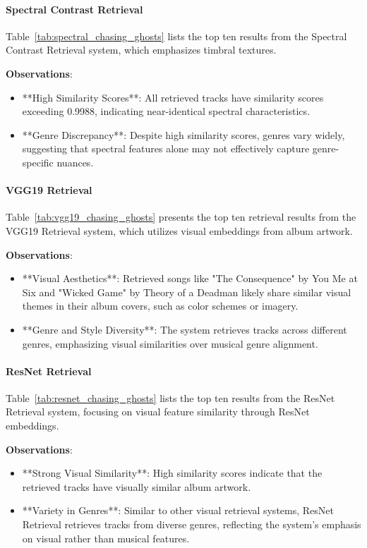 \documentclass[sigconf]{acmart}
\begin{document}
\paragraph{Spectral Contrast Retrieval}

Table~\ref{tab:spectral_chasing_ghosts} lists the top ten results from the Spectral Contrast Retrieval system, which emphasizes timbral textures.

\textbf{Observations}:
\begin{itemize}
    \item **High Similarity Scores**: All retrieved tracks have similarity scores exceeding 0.9988, indicating near-identical spectral characteristics.
    \item **Genre Discrepancy**: Despite high similarity scores, genres vary widely, suggesting that spectral features alone may not effectively capture genre-specific nuances.
\end{itemize}

\paragraph{VGG19 Retrieval}

Table~\ref{tab:vgg19_chasing_ghosts} presents the top ten retrieval results from the VGG19 Retrieval system, which utilizes visual embeddings from album artwork.

\textbf{Observations}:
\begin{itemize}
    \item **Visual Aesthetics**: Retrieved songs like "The Consequence" by You Me at Six and "Wicked Game" by Theory of a Deadman likely share similar visual themes in their album covers, such as color schemes or imagery.
    \item **Genre and Style Diversity**: The system retrieves tracks across different genres, emphasizing visual similarities over musical genre alignment.
\end{itemize}

\paragraph{ResNet Retrieval}

Table~\ref{tab:resnet_chasing_ghosts} lists the top ten results from the ResNet Retrieval system, focusing on visual feature similarity through ResNet embeddings.

\textbf{Observations}:
\begin{itemize}
    \item **Strong Visual Similarity**: High similarity scores indicate that the retrieved tracks have visually similar album artwork.
    \item **Variety in Genres**: Similar to other visual retrieval systems, ResNet Retrieval retrieves tracks from diverse genres, reflecting the system's emphasis on visual rather than musical features.
\end{itemize}
\end{document}
